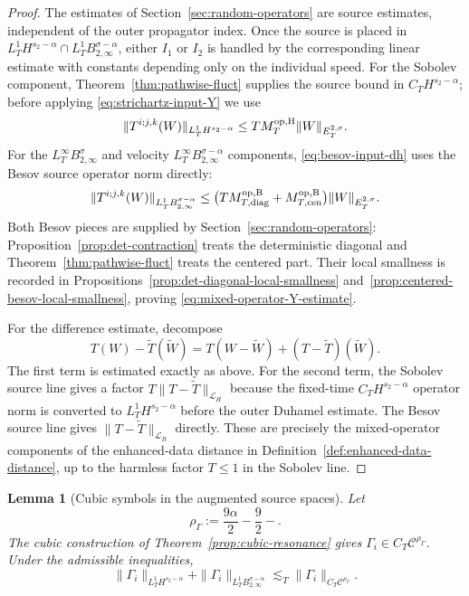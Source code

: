 \documentclass[10pt]{amsart}
\numberwithin{equation}{section}
\theoremstyle{plain}
\newtheorem{lemma}[theorem]{Lemma}
\theoremstyle{definition}
\theoremstyle{remark}
\newcommand{\C}{\mathcal{C}}
\newcommand{\Btwo}{B_{2,\infty}}
\begin{document}
\begin{proof}
The estimates of Section~\ref{sec:random-operators} are source estimates, independent of the outer propagator index.  Once the source is placed in $L_T^1H^{s_2-\alpha}\cap L_T^1B_{2,\infty}^{\sigma-\alpha}$, either $I_1$ or $I_2$ is handled by the corresponding linear estimate with constants depending only on the individual speed.  For the Sobolev component, Theorem~\ref{thm:pathwise-fluct} supplies the source bound in $C_TH^{s_2-\alpha}$; before applying \eqref{eq:strichartz-input-Y} we use
\[
        \|T^{i;j,k}(W)\|_{L_T^1H^{s_2-\alpha}}
        \le T M_T^{\rm op,H}\|W\|_{E_T^{2,\sigma}}.
\]
For the $L_T^\infty\Btwo^\sigma$ and velocity $L_T^\infty\Btwo^{\sigma-\alpha}$ components, \eqref{eq:besov-input-dh} uses the Besov source operator norm directly:
\[
        \|T^{i;j,k}(W)\|_{L_T^1\Btwo^{\sigma-\alpha}}
        \le \bigl(T M_{T,\mathrm{diag}}^{\rm op,B}+M_{T,\mathrm{cen}}^{\rm op,B}\bigr)
        \|W\|_{E_T^{2,\sigma}}.
\]
Both Besov pieces are supplied by Section~\ref{sec:random-operators}: Proposition~\ref{prop:det-contraction} treats the deterministic diagonal and Theorem~\ref{thm:pathwise-fluct} treats the centered part.  Their local smallness is recorded in Propositions~\ref{prop:det-diagonal-local-smallness} and~\ref{prop:centered-besov-local-smallness}, proving \eqref{eq:mixed-operator-Y-estimate}.

For the difference estimate, decompose
\[
        T(W)-\widetilde T(\widetilde W)=T(W-\widetilde W)+(T-\widetilde T)(\widetilde W).
\]
The first term is estimated exactly as above.  For the second term, the Sobolev source line gives a factor $T\|T-\widetilde T\|_{\mathcal L_H}$ because the fixed-time $C_TH^{s_2-\alpha}$ operator norm is converted to $L_T^1H^{s_2-\alpha}$ before the outer Duhamel estimate.  The Besov source line gives $\|T-\widetilde T\|_{\mathcal L_B}$ directly.  These are precisely the mixed-operator components of the enhanced-data distance in Definition~\ref{def:enhanced-data-distance}, up to the harmless factor $T\le1$ in the Sobolev line.
\end{proof}

\begin{lemma}[Cubic symbols in the augmented source spaces]\label{lem:cubic-source-compatibility}
Let
\[
        \rho_\Gamma:=\frac{9\alpha}{2}-\frac92-.
\]
The cubic construction of Theorem~\ref{prop:cubic-resonance} gives $\Gamma_i\in C_T\C^{\rho_\Gamma}$.  Under the admissible inequalities,
\begin{equation}\label{eq:cubic-augmented-source}
 \|\Gamma_i\|_{L_T^1H^{s_2-\alpha}}
 +\|\Gamma_i\|_{L_T^1\Btwo^{\sigma-\alpha}}
 \lesssim_T \|\Gamma_i\|_{C_T\C^{\rho_\Gamma}}.
\end{equation}
\end{lemma}
\end{document}
